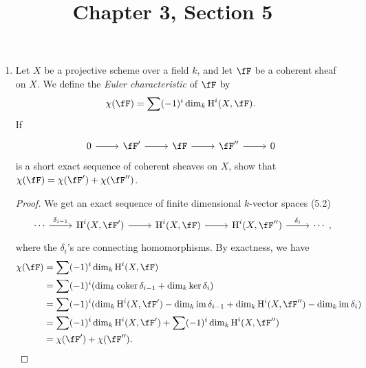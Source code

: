 \documentclass[a4paper]{article}
\title{Chapter 3, Section 5}
\begin{document}
\maketitle

\begin{enumerate} [label=\textbf{\arabic*.}, leftmargin=0em]

  \item Let $X$ be a projective scheme over a field $k$, and let $\fF$ be a coherent sheaf on $X$.
        We define the \textit{Euler characteristic} of $\fF$ by
        \begin{equation*}
          \chi(\fF) = \sum (-1)^i \dim_k{\cH^i(X, \fF)}.
        \end{equation*}
        If
        \[ \begin{tikzcd}
            0 \arrow[r] & \fF' \arrow[r] & \fF \arrow[r] & \fF'' \arrow[r] & 0
          \end{tikzcd} \]
        is a short exact sequence of coherent sheaves on $X$, show that $\chi(\fF) = \chi(\fF') + \chi(\fF'')$.

        \begin{proof}
          We get an exact sequence of finite dimensional $k$-vector spaces (5.2)
          \[ \begin{tikzcd}
              \cdots \arrow[r, "\delta_{i - 1}"] & {\cH^i(X, \fF')} \arrow[r] & {\cH^i(X, \fF)} \arrow[r] & {\cH^i(X, \fF'')} \arrow[r, "\delta_{i}"] & \cdots
            \end{tikzcd}, \]
          where the $\delta_i$'s are connecting homomorphisms.
          By exactness, we have
          \begin{align*}
            \chi(\fF) & =  \sum (-1)^i \dim_k \cH^i(X, \fF)                                                                                  \\
                      & = \sum (-1)^i(\dim_k \coker{\delta_{i - 1}} + \dim_k \ker{\delta_i})                                                 \\
                      & = \sum (-1)^i (\dim_k \cH^i(X, \fF') - \dim_k{\im{\delta_{i -1 }}} + \dim_k \cH^i(X, \fF'') - \dim_k{\im{\delta_i}}) \\
                      & = \sum (-1)^i \dim_k \cH^i(X, \fF') + \sum (-1)^i \dim_k \cH^i(X, \fF'')                                             \\
                      & = \chi(\fF') + \chi(\fF'').
          \end{align*}
        \end{proof}


\end{enumerate}
\end{document}
